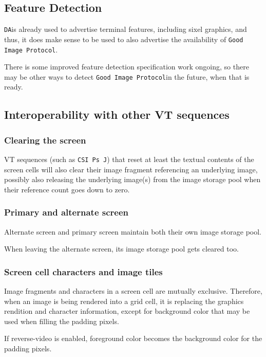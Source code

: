 \documentclass[a4paper]{article}
\newcommand{\code}[1]{\colorbox{light-gray}{\texttt{#1}}}
\newcommand{\DA}{\code{DA}}
\newcommand{\GoodImageProtocol}{\code{Good Image Protocol}}
\begin{document}
\subsection{Feature Detection}

\DA is already used to advertise terminal features, including sixel graphics, and thus,
it does make sense to be used to also advertise the availability of \GoodImageProtocol.

There is some improved feature detection specification work ongoing,
so there may be other ways to detect \GoodImageProtocol in the future, when that is ready.

\subsection{Interoperability with other VT sequences}

\subsubsection*{Clearing the screen}

VT sequences (such as \code{CSI Ps J}) that reset at least the textual contents of the screen cells will also
clear their image fragment referencing an underlying image, possibly also releasing the
underlying image(s) from the image storage pool when their reference count goes down to zero.

\subsubsection*{Primary and alternate screen}

Alternate screen and primary screen maintain both their own image storage pool.

When leaving the alternate screen, its image storage pool gets cleared too.

\subsubsection*{Screen cell characters and image tiles}

Image fragments and characters in a screen cell are mutually exclusive.
Therefore, when an image is being rendered into a grid cell, it is replacing the graphics rendition and
character information, except for background color that may be used when filling the padding pixels.

If reverse-video is enabled, foreground color becomes the background color for the padding pixels.
\end{document}
